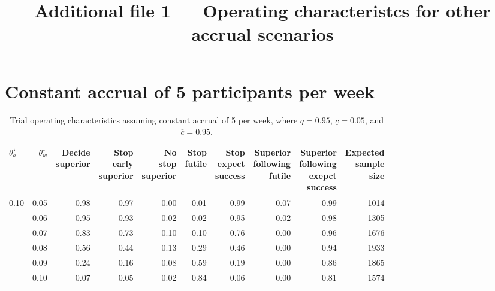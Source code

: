 \documentclass{article}
\title{Additional file 1 --- Operating characteristcs for other accrual scenarios}
\begin{document}
\maketitle

\section{Constant accrual of 5 participants per week}

\begin{table}[!ht]
	\footnotesize
	\caption{\label{tab:oc1}Trial operating characteristics assuming constant accrual of 5 per week, where $q=0.95$, $\underline{c}=0.05$, and $\overline{c}=0.95$.}
	\centering
	\begin{tabular}[t]{lrrrrrrrrr}
	\toprule
	$\theta_a^\star$ & $\theta_w^\star$ & \makecell{Decide\\superior} & \makecell{Stop\\early\\superior} & \makecell{No\\stop\\superior} & \makecell{Stop\\futile} & \makecell{Stop\\expect\\success} & \makecell{Superior\\following\\futile} & \makecell{Superior\\following\\exepct\\success} & \makecell{Expected\\sample\\size}\\
	\midrule
	0.10 & 0.05 & 0.98 & 0.97 & 0.00 & 0.01 & 0.99 & 0.07 & 0.99 & 1014\\
	     & 0.06 & 0.95 & 0.93 & 0.02 & 0.02 & 0.95 & 0.02 & 0.98 & 1305\\
	     & 0.07 & 0.83 & 0.73 & 0.10 & 0.10 & 0.76 & 0.00 & 0.96 & 1676\\
	     & 0.08 & 0.56 & 0.44 & 0.13 & 0.29 & 0.46 & 0.00 & 0.94 & 1933\\
	     & 0.09 & 0.24 & 0.16 & 0.08 & 0.59 & 0.19 & 0.00 & 0.86 & 1865\\
	     & 0.10 & 0.07 & 0.05 & 0.02 & 0.84 & 0.06 & 0.00 & 0.81 & 1574\\
	\bottomrule
	\end{tabular}
\end{table}
\end{document}

